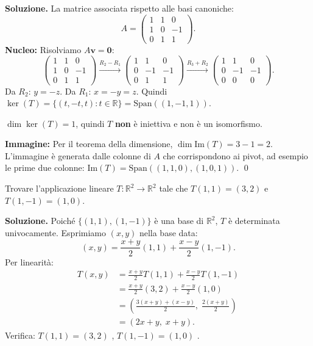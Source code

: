 \textbf{Soluzione.} La matrice associata rispetto alle basi canoniche:
\[ A = \begin{pmatrix} 1 & 1 & 0 \\ 1 & 0 & -1 \\ 0 & 1 & 1 \end{pmatrix}. \]
\textbf{Nucleo:} Risolviamo $A\mathbf{v} = \mathbf{0}$:
\[ \begin{pmatrix} 1 & 1 & 0 \\ 1 & 0 & -1 \\ 0 & 1 & 1 \end{pmatrix} \xrightarrow{\scriptscriptstyle R_2 - R_1} \begin{pmatrix} 1 & 1 & 0 \\ 0 & -1 & -1 \\ 0 & 1 & 1 \end{pmatrix} \xrightarrow{\scriptscriptstyle R_3 + R_2} \begin{pmatrix} 1 & 1 & 0 \\ 0 & -1 & -1 \\ 0 & 0 & 0 \end{pmatrix}. \]
Da $R_2$: $y = -z$. Da $R_1$: $x = -y = z$. Quindi $\ker(T) = \{(t, -t, t) : t \in \mathbb{R}\} = \text{Span}((1,-1,1))$.

$\dim\ker(T) = 1$, quindi $T$ \textbf{non} è iniettiva e non è un isomorfismo.

\textbf{Immagine:} Per il teorema della dimensione, $\dim\text{Im}(T) = 3 - 1 = 2$. L'immagine è generata dalle colonne di $A$ che corrispondono ai pivot, ad esempio le prime due colonne: $\text{Im}(T) = \text{Span}((1,1,0), (1,0,1))$. \qed

\medskip

\begin{examplebox}
Trovare l'applicazione lineare $T \colon \mathbb{R}^2 \to \mathbb{R}^2$ tale che $T(1,1) = (3, 2)$ e $T(1,-1) = (1, 0)$.
\end{examplebox}

\textbf{Soluzione.} Poiché $\{(1,1), (1,-1)\}$ è una base di $\mathbb{R}^2$, $T$ è determinata univocamente. Esprimiamo $(x,y)$ nella base data:
\[ (x,y) = \frac{x+y}{2}(1,1) + \frac{x-y}{2}(1,-1). \]
Per linearità:
\begin{align*}
    T(x,y) &= \frac{x+y}{2}T(1,1) + \frac{x-y}{2}T(1,-1) \\
    &= \frac{x+y}{2}(3,2) + \frac{x-y}{2}(1,0) \\
    &= \left(\frac{3(x+y) + (x-y)}{2}, \; \frac{2(x+y)}{2}\right) \\
    &= (2x + y, \; x + y).
\end{align*}
Verifica: $T(1,1) = (3, 2)$ \checkmark, $T(1,-1) = (1, 0)$ \checkmark.

